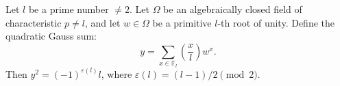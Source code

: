 Let $l$ be a prime number $\neq 2$. Let $\Omega$ be an algebraically closed field of characteristic $p \neq l$, and let $w \in \Omega$ be a primitive $l$-th root of unity. Define the quadratic Gauss sum:
$$y = \sum_{x \in \mathbb{F}_l} \left(\frac{x}{l}\right) w^x.$$
Then $y^2 = (-1)^{\varepsilon(l)} l$, where $\varepsilon(l) = (l-1)/2 \pmod{2}$.
